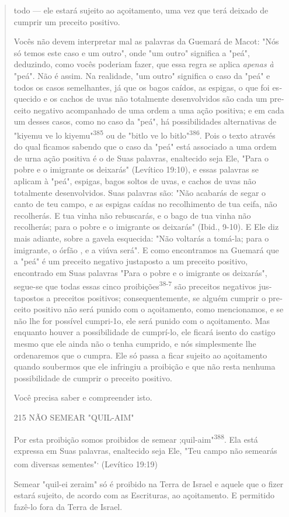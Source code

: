 \begin{quote}todo --- ele estará sujeito ao açoitamento, uma vez que terá deixado de
cumprir um preceito positivo.

Vocês não devem interpretar mal as palavras da Guemará de Macot: "Nós só
temos este caso e um outro", onde "um outro" significa a "peá",
deduzindo, como vocês poderiam fazer, que essa regra se aplica
\emph{apenas à} "peá". Não é assim. Na realidade, "um outro" significa o
caso da "peá" e todos os casos semelhantes, já que os bagos caídos, as
espigas, o que foi es­quecido e os cachos de uvas não totalmente
desenvolvidos são cada um pre­ceito negativo acompanhado de uma ordem a
uma ação positiva; e em cada um desses casos, como no caso da "peá", há
possibilidades alternativas de "kiyemu ve lo
kiyemu"\textsuperscript{385} ou de "bitlo ve lo
bitlo"\textsuperscript{386}. Pois o texto através do qual ficamos
sabendo que o caso da "peá" está associado a uma ordem de urna ação
positiva é o de Suas palavras, enaltecido seja Ele, "Para o pobre e o
imigrante os deixarás" (Levítico 19:10), e essas palavras se aplicam à
"peá", espigas, bagos soltos de uvas, e cachos de uvas não totalmente
desenvolvidos. Suas palavras são: "Não acabarás de segar o canto de teu
campo, e as espigas caídas no recolhimento de tua ceifa, não recolherás.
E tua vinha não rebusca­rás, e o bago de tua vinha não recolherás; para
o pobre e o imigrante os deixa­rás" (Ibid., 9-10). E Ele diz mais
adiante, sobre a gavela esquecida: "Não volta­rás a tomá-la; para o
imigrante, o órfão , e a viúva será". E como encontramos na Guemará que
a "peá" é um preceito negativo justaposto a um preceito positivo,
encontrado em Suas palavras "Para o pobre e o imigrante os deixa­rás",
segue-se que todas essas cinco proibições\textsuperscript{38-7} são
preceitos negativos jus­tapostos a preceitos positivos;
consequentemente, se alguém cumprir o pre­ceito positivo não será punido
com o açoitamento, como mencionamos, e se não lhe for possível
cumpri-1o, ele será punido com o açoitamento. Mas enquanto houver a
possibilidade de cumprí-lo, ele ficará isento do castigo mesmo que ele
ainda não o tenha cumprido, e nós simplesmente lhe ordena­remos que o
cumpra. Ele só passa a ficar sujeito ao açoitamento quando sou­bermos
que ele infringiu a proibição e que não resta nenhuma possibilidade de
cumprir o preceito positivo.

Você precisa saber e compreender isto.

215 NÃO SEMEAR "QUIL-AIM"

Por esta proibição somos proibidos de semear
;quil-aim"\textsuperscript{388}. Ela es­tá expressa em Suas palavras,
enaltecido seja Ele, "Teu campo não semearás com diversas
sementes"\textsuperscript{,} (Levítico 19:19)

Semear "quil-ei zeraim" só é proibido na Terra de Israel e aquele que o
fizer estará sujeito, de acordo com as Escrituras, ao açoitamento. E
per­mitido fazê-lo fora da Terra de Israel.
\end{quote}

